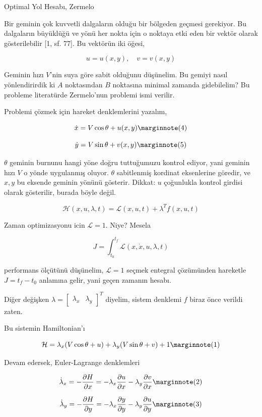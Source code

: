 \documentclass[12pt,fleqn]{article}\usepackage{../../common}
\begin{document}
Optimal Yol Hesabı, Zermelo

Bir geminin çok kuvvetli dalgaların olduğu bir bölgeden geçmesi
gerekiyor. Bu dalgaların büyüklüğü ve yönü her nokta için o noktaya
etki eden bir vektör olarak gösterilebilir [1, sf. 77]. Bu vektörün
iki öğesi, 

$$
u = u(x,y), \quad v = v(x,y)
$$

Geminin hızı $V$'nin suya göre sabit olduğunu düşünelim. Bu gemiyi
nasıl yönlendirirdik ki $A$ noktasından $B$ noktasına minimal zamanda
gidebilelim? Bu probleme literatürde Zermelo'nun problemi ismi verilir. 

Problemi çözmek için hareket denklemlerini yazalım, 

$$
\dot{x} = V \cos\theta + u(x,y)
\mlabel{4}
$$

$$
\dot{y} = V \sin\theta + v(x,y)
\mlabel{5}
$$

$\theta$ geminin burnunu hangi yöne doğru tuttuğumuzu kontrol ediyor,
yani geminin hızı $V$ o yönde uygulanmış oluyor. $\theta$ sabitlenmiş
kordinat eksenlerine göredir, ve $x,y$ bu eksende geminin yönünü
gösterir.  Dikkat: $u$ çoğunlukla kontrol girdisi olarak gösterilir,
burada böyle değil.

$$
\mathcal{H}(x, u, \lambda, t) = \mathcal{L}( x, u, t) + \lambda^T f(x, u, t) 
$$

Zaman optimizasyonu icin $\mathcal{L} = 1$. Niye? Mesela

$$
J = \int _{t_0}^{t_f} \mathcal{L}( x, \dot{x}, u, \lambda, t)
$$

performans ölçütünü düşünelim, $\mathcal{L} = 1$ seçmek entegral
çözümünden hareketle $J = t_f - t_0$ anlamına gelir, yani geçen
zamanın hesabı.

Diğer değişken $\lambda =
\left[\begin{array}{cc} \lambda_x & \lambda_y \end{array}\right]^T$
diyelim, sistem denklemi $f$ biraz önce verildi zaten.

Bu sistemin Hamiltonian'ı 

$$
\mathcal{H} = 
\lambda_x (V \cos \theta + u ) + 
\lambda_y (V \sin \theta + v ) + 1
\mlabel{1}
$$

Devam edersek, Euler-Lagrange denklemleri

$$
\dot{\lambda}_x = -\frac{\partial H}{\partial x }  = 
-\lambda_x \frac{\partial u}{\partial x} - 
 \lambda_y \frac{\partial v}{\partial x}
\mlabel{2}
$$

$$
\dot{\lambda}_y = -\frac{\partial H}{\partial y}  = 
-\lambda_x \frac{\partial y}{\partial y} - 
 \lambda_y \frac{\partial u}{\partial y}
\mlabel{3}
$$
\end{document}
